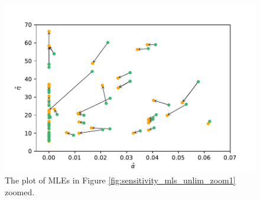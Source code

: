\begin{figure}
    \centering
    \includegraphics[scale=0.7]{pictures/Sensitivity/mles_unlim_zoom2.pdf}
    \caption[Zoomed in on the MLEs in Figure \ref{fig:sensitivity_mls_unlim_zoom1}]{The plot of MLEs in Figure \ref{fig:sensitivity_mls_unlim_zoom1} zoomed.}
    \label{fig:sensitivity_mls_unlim_zoom2}
\end{figure}



